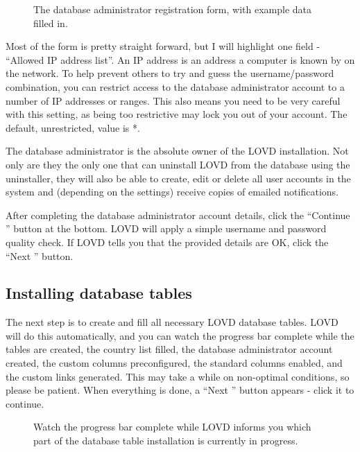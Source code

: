 \begin{figure}[ht]
  \begin{shaded}
  \caption{The database administrator registration form, with example data filled in.}
  \end{shaded}
\end{figure}

Most of the form is pretty straight forward, but I will highlight one field - ``Allowed IP address list''.
An IP address is an address a computer is known by on the network.
To help prevent others to try and guess the username/password combination,
 you can restrict access to the database administrator account to a number of IP addresses or ranges.
This also means you need to be very careful with this setting,
 as being too restrictive may lock you out of your account.
The default, unrestricted, value is *.

\begin{infotable}
The database administrator is the absolute owner of the LOVD installation.
Not only are they the only one that can uninstall LOVD from the database using the uninstaller,
 they will also be able to create, edit or delete all user accounts in the system and
 (depending on the settings) receive copies of emailed notifications.
\end{infotable}

\noindent
After completing the database administrator account details,
 click the ``Continue \guillemotright'' button at the bottom.
LOVD will apply a simple username and password quality check.
If LOVD tells you that the provided details are OK, click the ``Next \guillemotright'' button.



\subsection{Installing database tables}
The next step is to create and fill all necessary LOVD database tables.
LOVD will do this automatically,
 and you can watch the progress bar complete while the tables are created,
 the country list filled, the database administrator account created, the custom columns preconfigured,
 the standard columns enabled, and the custom links generated.
This may take a while on non-optimal conditions, so please be patient.
When everything is done, a ``Next \guillemotright'' button appears - click it to continue.

\begin{figure}[ht]
  \begin{shaded}
  \caption{Watch the progress bar complete while LOVD
   informs you which part of the database table installation is currently in progress.}
  \end{shaded}
\end{figure}



